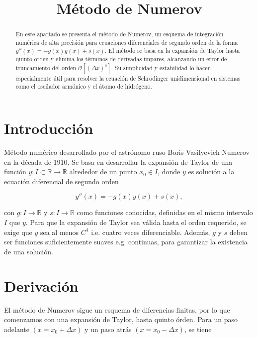 \documentclass[11pt]{article}
\date{}
\title{Método de Numerov}
\begin{document}
\maketitle

\begin{abstract}
En este apartado se presenta el método de Numerov, un esquema de integración
numérica de alta precisión para ecuaciones diferenciales de segundo orden
de la forma \(y''(x) = -g(x)y(x) + s(x)\).
El método se basa en la expansión de Taylor hasta quinto orden y elimina los
términos de derivadas impares, alcanzando un error de truncamiento del orden
\(\mathcal{O}[(\Delta x)^6]\).
Su simplicidad y estabilidad lo hacen especialmente útil para resolver
la ecuación de Schrödinger unidimensional en sistemas como el oscilador armónico
y el átomo de hidrógeno.
\end{abstract}

\section{Introducción}
\label{sec:org58b07f0}

Método numérico desarrollado por el astrónomo ruso Boris Vasilyevich Numerov en la década de 1910. Se basa en desarrollar la expansión de Taylor de una función \(y : I \subset \mathbb{R} \to \mathbb{R}\) alrededor de un punto \(x_0 \in I\), donde \(y\) es solución a la ecuación diferencial de segundo orden

\begin{equation}
\label{eq:numerov-eq}
    y''(x) = - g(x)y(x) + s(x),
\end{equation}

con \(g: I \to \mathbb{R}\) y \(s: I \to \mathbb{R}\) como funciones conocidas, definidas en el mismo intervalo \(I\) que \(y\). Para que la expansión de Taylor sea válida hasta el orden requerido, se exige que \(y\) sea al menos \(C^4\) i.e. cuatro veces diferenciable. Además, \(g\) y \(s\) deben ser funciones suficientemente suaves e.g. continuas, para garantizar la existencia de una solución.

\section{Derivación}

El método de Numerov sigue un esquema de diferencias finitas, por lo que comenzamos con una expansión de Taylor, hasta quinto órden. Para un paso adelante \((x= x_{0} + \Delta x)\) y un paso atrás \((x=x_{0} - \Delta x)\), se tiene
\end{document}

